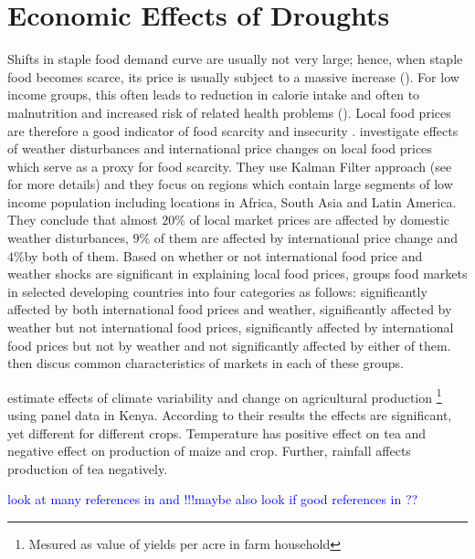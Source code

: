 \documentclass[a4paper,12pt]{article}
\begin{document}
 \section*{Economic Effects of Droughts}
 
Shifts in staple food demand curve are usually not very large; hence, when staple food becomes scarce, its price is usually subject to a massive increase (\citealp{Brown2015, brown2014book}). For low income groups, this often leads to reduction in calorie intake and often to malnutrition and increased risk of related health problems (\citealp{Golden2011, Handa2006}). Local food prices are therefore a good indicator of food scarcity and insecurity \citep{Brown2015}. \cite{Brown2015} investigate effects of weather disturbances and international price changes on local food prices which serve as a proxy for food scarcity. They use Kalman Filter approach (see \cite{KoopmanSJ} for more details) and they focus on regions which contain large segments of low income population including locations in Africa, South Asia and Latin America. They conclude that almost $20\%$ of local market prices are affected by domestic weather disturbances, $9\%$ of them are affected by international price change and $4\%$by both of them. Based on whether or not international food price and weather shocks are significant in explaining local food prices, \cite{brown2014book} groups food markets in selected developing countries into four categories as follows: significantly affected by both international food prices and weather, significantly affected by weather but not international food prices, significantly affected by international food prices but not by weather and not significantly affected by either of them. \cite{brown2014book} then discus common characteristics of markets in each of these groups.

\cite{Ochieng2016} estimate effects of climate variability and change on agricultural production \footnote{Mesured as value of yields per acre in farm household} using panel data in Kenya. According to their results the effects are significant, yet different for different crops. Temperature has positive effect on tea and negative effect on production of maize and crop. Further, rainfall affects production of tea negatively.





\textcolor{blue}{look at many references in \cite{Brown2015} and \cite{Ochieng2016} !!!maybe also look if good references in \cite{OxfamIDS}??}
\end{document}
